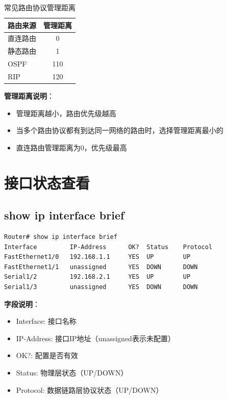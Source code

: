 \documentclass[12pt,a4paper]{ctexart}
\begin{document}
\begin{table}[htbp]
\centering
\begin{tabular}{lc}
\toprule
\textbf{路由来源} & \textbf{管理距离} \\
\midrule
直连路由 & 0 \\
静态路由 & 1 \\
OSPF & 110 \\
RIP & 120 \\
\bottomrule
\end{tabular}
\caption{常见路由协议管理距离}
\end{table}

\begin{keybox}
\textbf{管理距离说明}：
\begin{itemize}[itemsep=0pt]
    \item 管理距离越小，路由优先级越高
    \item 当多个路由协议都有到达同一网络的路由时，选择管理距离最小的
    \item 直连路由管理距离为0，优先级最高
\end{itemize}
\end{keybox}

\section{接口状态查看}

\subsection{show ip interface brief}

\begin{cmdbox}
\begin{lstlisting}
Router# show ip interface brief
Interface         IP-Address      OK?  Status    Protocol
FastEthernet1/0   192.168.1.1     YES  UP        UP
FastEthernet1/1   unassigned      YES  DOWN      DOWN
Serial1/2         192.168.2.1     YES  UP        UP
Serial1/3         unassigned      YES  DOWN      DOWN
\end{lstlisting}

\textbf{字段说明}：
\begin{itemize}[itemsep=0pt]
    \item Interface: 接口名称
    \item IP-Address: 接口IP地址（unassigned表示未配置）
    \item OK?: 配置是否有效
    \item Status: 物理层状态（UP/DOWN）
    \item Protocol: 数据链路层协议状态（UP/DOWN）
\end{itemize}
\end{cmdbox}
\end{document}
